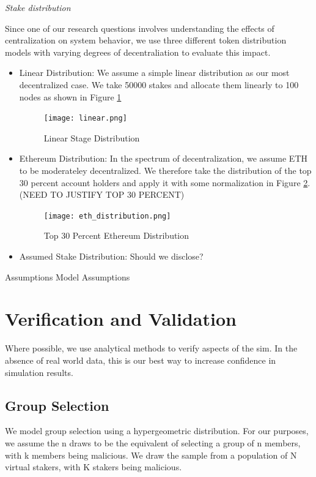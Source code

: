 \documentclass[conference]{IEEEtran}
\begin{document}
\textit{Stake distribution} 

Since one of our research questions involves understanding the effects of centralization
on system behavior, we use three different token distribution models with 
varying degrees of decentraliation to evaluate this impact. 

\begin{itemize}
\item Linear Distribution: We assume a simple linear distribution as our most 
decentralized case. We take 50000 stakes and allocate them linearly to 100 nodes
as shown in Figure \ref{fig:linear_distribution}

\begin{figure}
    \texttt{[image: linear.png]}
    \caption{Linear Stage Distribution}
    \label{fig:linear_distribution}
\end{figure}

\item Ethereum Distribution: In the spectrum of decentralization, we assume 
ETH to be moderateley decentralized. We therefore take the distribution of the 
top 30 percent account holders and apply it with some normalization in Figure \ref{fig:eth_distribution}.
(NEED TO JUSTIFY TOP 30 PERCENT)

\begin{figure}
    \texttt{[image: eth\_distribution.png]}
    \caption{Top 30 Percent Ethereum Distribution}
    \label{fig:eth_distribution}
\end{figure}

\item Assumed Stake Distribution: Should we disclose?
\end{itemize}


Assumptions
Model Assumptions
    
\section{Verification and Validation}
Where possible, we use analytical methods to verify aspects of the sim. In the absence of 
real world data, this is our best way to increase confidence in simulation results.

\subsection{Group Selection}
We model group selection using a hypergeometric distribution. For our purposes, we assume the n draws to 
be the equivalent of selecting a group of n members, with k members being malicious. We draw the sample from
a population of N virtual stakers, with K stakers being malicious. 
\end{document}
